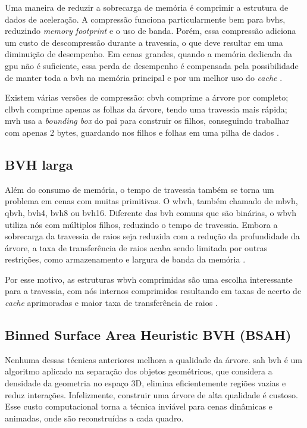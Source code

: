 Uma maneira de reduzir a sobrecarga de memória é comprimir a estrutura de dados de aceleração. A compressão funciona particularmente bem para \glspl{bvh}, reduzindo \textit{memory footprint} e o uso de banda. Porém, essa compressão adiciona um custo de descompressão durante a travessia, o que deve resultar em uma diminuição de desempenho. Em cenas grandes, quando a memória dedicada da \gls{gpu} não é suficiente, essa perda de desempenho é compensada pela possibilidade de manter toda a \gls{bvh} na memória principal e por um melhor uso do \textit{cache} \cite{benthin2018compressed}.

Existem várias versões de compressão: \gls{cbvh} comprime a árvore por completo; \gls{clbvh} comprime apenas as folhas da árvore, tendo uma travessia mais rápida; \gls{mvh} usa a \textit{bounding box} do pai para construir os filhos, conseguindo trabalhar com apenas 2 bytes, guardando nos filhos e folhas em uma pilha de dados \cite{pantaleoni2010hlbvh} \cite{benthin2018compressed}.


\subsection{BVH larga}

Além do consumo de memória, o tempo de travessia também se torna um problema em cenas com muitas primitivas. O \gls{wbvh}, também chamado de \gls{mbvh}, \gls{qbvh}, \gls{bvh4}, \gls{bvh8} ou \gls{bvh16}. Diferente das \gls{bvh} comuns que são binárias, o \gls{wbvh} utiliza nós com múltiplos filhos, reduzindo o tempo de travessia. Embora a sobrecarga da travessia de raios seja reduzida com a redução da profundidade da árvore, a taxa de transferência de raios acaba sendo limitada por outras restrições, como armazenamento e largura de banda da memória \cite{vaidyanathan2019wide} \cite{tsakok2009faster}.

Por esse motivo, as estruturas \gls{wbvh} comprimidas são uma escolha interessante para a travessia, com nós internos comprimidos resultando em taxas de acerto de \textit{cache} aprimoradas e maior taxa de transferência de raios \cite{vaidyanathan2019wide} \cite{tsakok2009faster}.


\subsection{Binned Surface Area Heuristic BVH (BSAH)}

Nenhuma dessas técnicas anteriores melhora a qualidade da árvore. \gls{sah} \gls{bvh} é um algoritmo aplicado na separação dos objetos geométricos, que considera a densidade da geometria no espaço 3D, elimina eficientemente regiões vazias e reduz interações. Infelizmente, construir uma árvore de alta qualidade é custoso. Esse custo computacional torna a técnica inviável para cenas dinâmicas e animadas, onde são reconstruídas a cada quadro.


